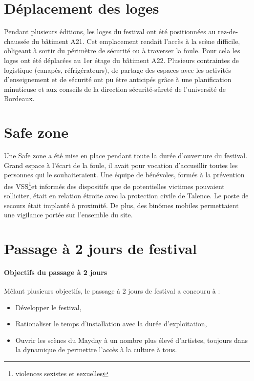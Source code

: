 \documentclass[12pt,a4paper]{report}
\begin{document}
\section{Déplacement des loges}
Pendant plusieurs éditions, les loges du festival ont été positionnées au rez-de-chaussée du bâtiment A21. Cet emplacement rendait l'accès à la scène difficile, obligeant à sortir du périmètre de sécurité ou à traverser la foule. Pour cela les loges ont été déplacées au 1er étage du bâtiment A22. Plusieurs contraintes de logistique (canapés, réfrigérateurs), de partage des espaces avec les activités d'enseignement et de sécurité ont pu être anticipés grâce à une planification minutieuse et aux conseils de la direction sécurité-sûreté de l'université de Bordeaux.

\section{Safe zone}
Une \og Safe zone \fg{}  a été mise en place pendant toute la durée d’ouverture du festival. Grand espace à l'écart de la foule, il avait pour vocation d'accueillir toutes les personnes qui le souhaiteraient. Une équipe de bénévoles, formés à la prévention des VSS\footnote{violences sexistes et sexuelles}et informés des dispositifs que de potentielles victimes pouvaient solliciter, était en relation étroite avec la protection civile de Talence. Le poste de secours était implanté à proximité. De plus, des binômes mobiles permettaient une vigilance portée sur l’ensemble du site.

\section{Passage à 2 jours de festival}

\paragraph{Objectifs du passage à 2 jours}
Mêlant plusieurs objectifs, le passage à 2 jours de festival a concouru à : 
\begin{itemize}
\item Développer le festival,
\item Rationaliser le temps d'installation avec la durée d'exploitation,
\item Ouvrir les scènes du Mayday à un nombre plus élevé d'artistes, toujours dans la dynamique de permettre l’accès à la culture à tous.
\end{itemize}
\end{document}
